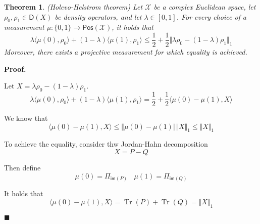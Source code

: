 \documentclass[aps,pra,onecolumn,notitlepage,superscriptaddress]{revtex4-1}
\newcommand{\spc}[1]{\mathcal{#1}}
\newcommand{\Pos}{\mathsf{Pos}}
\newcommand{\D}{\mathsf{D}}
\newcommand{\im}{\mathsf{im}}
\def\>{\rangle}
\def\<{\langle}
\newcommand{\Tr}{\operatorname{Tr}}
\newtheorem{theo}{Theorem}
\def\Proof{{\bf Proof.~}}
\def\qed{$\blacksquare$ \newline}
\begin{document}
    \begin{theo}
        (Holevo-Helstrom theorem) Let $\spc{X}$ be a complex Euclidean
        space, let $\rho_0 ,\rho_1 \in \D(X)$ be density operators, and let $\lambda \in [0,1]$. For every choice of a measurement $\mu : \{0,1\} \to \Pos(\spc{X})$, it holds that
        \begin{equation}
            \lambda \< \mu(0),\rho_0 \> + (1-\lambda )\< \mu(1),\rho_1 \> \leq \frac{1}{2} + \frac{1}{2} \Vert \lambda\rho_0 - (1-
            \lambda)\rho_1 \Vert_1
        \end{equation}
        Moreover, there exists a projective measurement for which equality is achieved.
    \end{theo}
    \Proof {
        Let $X = \lambda \rho_0 - (1-\lambda) \rho_1$.
        \begin{equation}
            \lambda \< \mu(0), \rho_0 \> + (1-\lambda) \< \mu(1), \rho_1 \> = \frac{1}{2} + \frac{1}{2} \< \mu(0)-\mu(1), X \>
        \end{equation}

        We know that
        \begin{equation}
            \< \mu(0)-\mu(1), X \> \leq \Vert \mu(0)-\mu(1) \Vert \Vert X \Vert_1 \leq \Vert X \Vert_1
        \end{equation}

        To achieve the equality, consider thw Jordan-Hahn decomposition
        \begin{equation}
            X = P - Q
        \end{equation}

        Then define
        \begin{equation}
            \mu(0) = \Pi_{\im(P)} \ \ \ \ \mu(1) = \Pi_{\im(Q)}
        \end{equation}
        
        It holds that 
        \begin{equation}
            \< \mu(0)-\mu(1), X \> = \Tr(P) + \Tr(Q) = \Vert X \Vert_1
        \end{equation}
    } \qed
\end{document}
